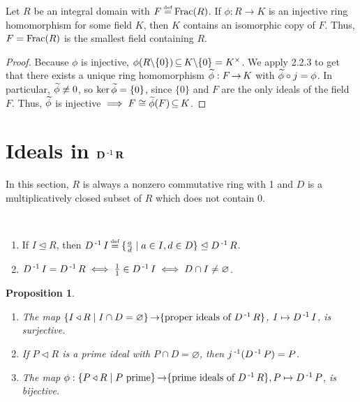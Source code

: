 \documentclass[11pt]{book}
\newcounter{counter}
\newtheorem{proposition}[counter]{Proposition}   \newtheorem{problem}[counter]{Problem}   \newtheorem*{proposition*}{Proposition}   \newtheorem*{lemma*}{Lemma}
\theoremstyle{definition}   \newtheorem{defn}[counter]{Definition} %
\newcommand{\bs}{\backslash}   \newcommand{\A}{\mathcal{A}}   \newcommand{\sy}{\textnormal{Syl}}   \newcommand{\size}[1]{\left| #1 \right|}
\newcommand{\nsg}{\mathrel{\unlhd}}   \newcommand{\ind}{\parindent24pt}   \newcommand{\vn}{\varnothing}
\newcommand\myeq{\mathrel{\overset{\makebox[0pt]{\mbox{\normalfont\tiny\sffamily \textrm{def}}}}{=}}}
\newcommand{\tl}{\triangleleft}   \newcommand{\sd}[1]{\rtimes_{#1}}   \newcommand{\x}{^{\times}}   \newcommand{\cyc}[1]{\begin{pmatrix} #1 \end{pmatrix}}
\DeclareMathOperator{\ra}{\rightarrow}   \DeclareMathOperator{\Poly}{\mathbf{P}}   \DeclareMathOperator{\spn}{\textnormal{span}}   \DeclareMathOperator{\aut}{\textnormal{Aut}}
\newcommand{\vs}{\vspace{8pt}}
\numberwithin{counter}{chapter}
\begin{document}
\vs

\begin{corollary}
Let $R$ be an integral domain with $F \myeq \tn{Frac}(R)$. If $\phi : R \ra K$ is an injective ring homomorphism for some field $K$, then $K$ contains an isomorphic copy of $F$. Thus, $F = \textnormal{Frac}(R)$ is the smallest field containing $R$.
\end{corollary}

\begin{proof}
Because $\phi$ is injective, $\phi(R \bs \{0\}) \sub K \bs\{0\} = K\x$. We apply 2.2.3 to get that there exists a unique ring homomorphism $\wt{\phi} : F \ra K$ with $\widetilde{\phi} \circ j = \phi$. In particular, $\widetilde{\phi} \not\equiv 0$, so $\ker \widetilde{\phi} = \{0\}$, since $\{0\}$ and $F$ are the only ideals of the field $F$. Thus, $\widetilde{\phi}$ is injective $\implies F \cong \widetilde{\phi}(F) \operatorname{\subseteq} K$.
\end{proof}

\vs

\section*{Ideals in $\mathbf{D\operatorname{^{-1}} R}$}

In this section, $R$ is always a nonzero commutative ring with 1 and $D$ is a multiplicatively closed subset of $R$ which does not contain 0.

\vs

\begin{remark}
\
\begin{enumerate}
\item[(a)] If $I \nsg R$, then $D\inv I \myeq \{\frac{a}{d} \mid a \in I, d \in D\} \nsg D\inv R$.
\item[(b)] $D\inv I = D\inv R \iff \frac{1}{1} \in D\inv I \iff D \cap I \ne \vn$.
\end{enumerate}
\end{remark}

\vs

\begin{proposition}
\
\begin{enumerate}
\item[(a)] The map $\{I \tl R \mid I \cap D = \vn \} \ra \{\tn{proper ideals of } D\inv R\}$, $I \mapsto D\operatorname{^{-1}} I$, is surjective.
\item[(b)] If $P \tl R$ is a prime ideal with $P \cap D = \vn$, then $j\operatorname{^{-1}}(D\operatorname{^{-1}} P) = P$.
\item[(c)] The map $\phi : \{P \tl R \mid P \tn{ prime}\} \ra \{\tn{prime ideals of } D\inv R\}, P \mapsto D\inv P$, is bijective.
\end{enumerate}
\end{proposition}
\end{document}
